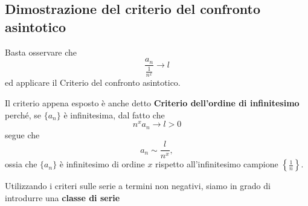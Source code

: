 \documentclass{article}
\begin{document}
 \subsection*{Dimostrazione del criterio del confronto asintotico}
Basta osservare che 
\[
\frac{a_n}{\frac{1}{n^x}} \to l
\]
ed applicare il Criterio del confronto asintotico.

Il criterio appena esposto è anche detto \textbf{Criterio dell'ordine di infinitesimo} perché, se \(\{a_n\}\) è infinitesima, dal fatto che 
\[
n^x a_n \to l > 0
\]
segue che 
\[
a_n \sim \frac{l}{n^x},
\]
ossia che \(\{a_n\}\) è infinitesimo di ordine \(x\) rispetto all'infinitesimo campione \(\left\{\frac{1}{n}\right\}\).

Utilizzando i criteri sulle serie a termini non negativi, siamo in grado di introdurre una \textbf{classe di serie} 
 
\end{document}
